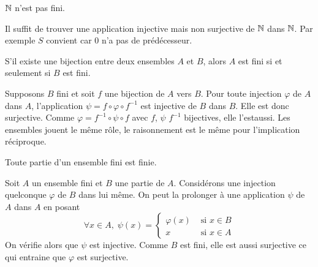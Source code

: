 \begin{prop}[\ref{pN: Nnfini}]
 $\mathbb{N}$ n'est pas fini.
\end{prop}
\begin{demo}
 Il suffit de trouver une application injective mais non surjective de $\mathbb{N}$ dans $\mathbb{N}$. Par exemple $S$ convient car $0$ n'a pas de prédécesseur.
\end{demo}

\begin{prop}[\ref{pN: CarFiBij}]
 S'il existe une bijection entre deux ensembles $A$ et $B$, alors $A$ est fini si et seulement si $B$ est fini.
\end{prop}
\begin{demo}
Supposons $B$ fini et soit $f$ une bijection de $A$ vers $B$. Pour toute injection $\varphi$ de $A$ dans $A$, l'application $\psi = f\circ \varphi \circ f^{-1}$ est injective de $B$ dans $B$. Elle est donc surjective. Comme $\varphi = f^{-1}\circ \psi \circ f$ avec $f$, $\psi$ $f^{-1}$ bijectives, elle l'estaussi. Les ensembles jouent le même rôle, le raisonnement est le même pour l'implication réciproque. 
\end{demo}

\begin{lemn}\label{lN: IncFin}
 Toute partie d'un ensemble fini est finie.
\end{lemn}
\begin{demo}
 Soit $A$ un ensemble fini et $B$ une partie de $A$. Considérons une injection quelconque $\varphi$ de $B$ dans lui même. On peut la prolonger à une application $\psi$ de $A$ dans $A$ en posant
\begin{displaymath}
 \forall x \in A,\; \psi(x) = 
\left\lbrace 
\begin{aligned}
 \varphi(x) &\text{ si } x\in B \\ x &\text{ si } x\in A
\end{aligned}
\right. 
\end{displaymath}
On vérifie alors que $\psi$ est injective. Comme $B$ est fini, elle est aussi surjective ce qui entraine que $\varphi$ est surjective.
\end{demo}


